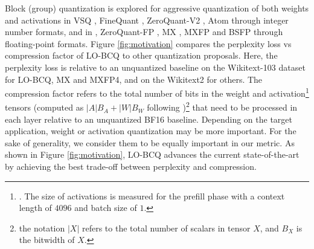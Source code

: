 Block (group) quantization is explored for aggressive quantization of both weights and activations in VSQ \citep{dai2021vsq}, FineQuant \citep{kim2023finequant}, ZeroQuant-V2 \citep{yao2023zeroquantv2}, Atom \citep{zhao2024atom} through integer number formats, and in \citep{zhang2023integer}, ZeroQuant-FP \citep{wu2023zeroquantfp}, MX \citep{rouhani2023microscaling}, MXFP \citep{rouhani2023shared} and BSFP \citep{lo2023block} through floating-point formats. Figure \ref{fig:motivation} compares the perplexity loss vs compression factor of LO-BCQ to other quantization proposals. Here, the perplexity loss is relative to an unquantized baseline on the Wikitext-103 dataset for LO-BCQ, MX and MXFP4, and on the Wikitext2 for others. The compression factor refers to the total number of bits in the weight and activation\footnote{\label{fn:rep_cost}. The size of activations is measured for the prefill phase with a context length of $4096$ and batch size of $1$.} tensors (computed as $|A|B_A + |W|B_W$ following \citet{csakr_guarantees})\footnote{the notation $|X|$ refers to the total number of scalars in tensor $X$, and $B_X$ is the bitwidth of $X$.} that need to be processed in each layer relative to an unquantized BF16 baseline. Depending on the target application, weight or activation quantization may be more important. For the sake of generality, we consider them to be equally important in our metric. As shown in Figure \ref{fig:motivation}, LO-BCQ advances the current state-of-the-art by achieving the best trade-off between perplexity and compression.



